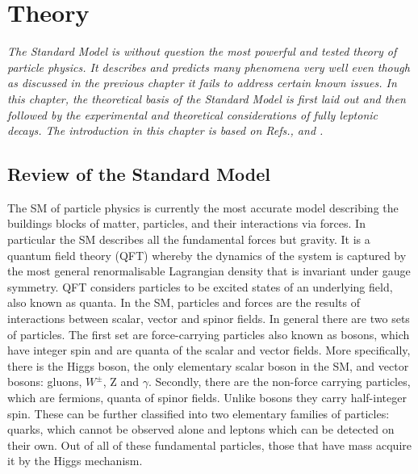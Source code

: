 \chapter{Theory}
\label{stheory}
\textit{The Standard Model is without question the most powerful and tested theory of particle physics. It describes and predicts many phenomena very well even though as discussed in the previous chapter it fails to address certain known issues. In this chapter, the theoretical basis of the Standard Model is first laid out and then followed by the experimental and theoretical considerations of fully leptonic decays. The introduction in this chapter is based on Refs.\cite{Griffiths:111880},\cite{Novaes:1999yn} and \cite{Pich:2012sx}.}



\section{Review of the Standard Model}
The \gls{SM} of particle physics is currently the most accurate model describing the buildings blocks of matter, particles, and their interactions via forces. In particular the \gls{SM} describes all the fundamental forces but gravity. It is a quantum field theory (\gls{QFT}) whereby the dynamics of the system is captured by the most general renormalisable Lagrangian density that is invariant under gauge symmetry. \gls{QFT} considers particles to be excited states of an underlying field, also known as quanta. In the \gls{SM}, particles and forces are the results of interactions between scalar, vector and spinor fields. In general there are two sets of particles. The first set are force-carrying particles also known as bosons, which have integer spin and are quanta of the scalar and vector fields. More specifically, there is the Higgs boson, the only elementary scalar boson in the \gls{SM}, and vector bosons: gluons, $W^{\pm}$, Z and $\gamma$. Secondly, there are the non-force carrying particles, which are fermions, quanta of spinor fields. Unlike bosons they carry half-integer spin. These can be further classified into two elementary families of particles: quarks, which cannot be observed alone and leptons which can be detected on their own. Out of all of these fundamental particles, those that have mass acquire it by the Higgs mechanism.

